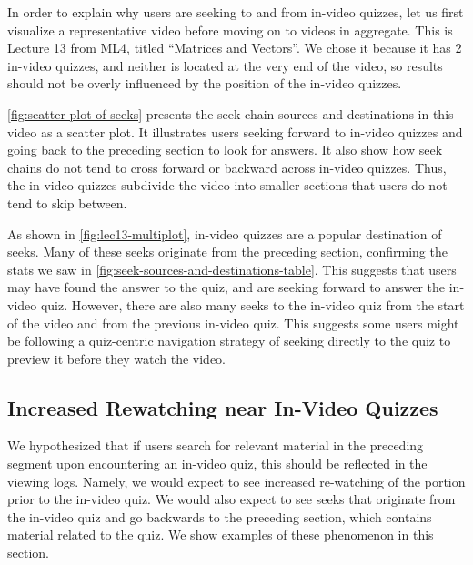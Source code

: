 \documentclass{sigchi}
\begin{document}
In order to explain why users are seeking to and from in-video quizzes, let us first visualize a representative video before moving on to videos in aggregate. This is Lecture 13 from ML4, titled ``Matrices and Vectors''. We chose it because it has 2 in-video quizzes, and neither is located at the very end of the video, so results should not be overly influenced by the position of the in-video quizzes.

\autoref{fig:scatter-plot-of-seeks} presents the seek chain sources and destinations in this video as a scatter plot. It illustrates users seeking forward to in-video quizzes and going back to the preceding section to look for answers. It also show how seek chains do not tend to cross forward or backward across in-video quizzes. Thus, the in-video quizzes subdivide the video into smaller sections that users do not tend to skip between.

As shown in \autoref{fig:lec13-multiplot}, in-video quizzes are a popular destination of seeks. Many of these seeks originate from the preceding section, confirming the stats we saw in \autoref{fig:seek-sources-and-destinations-table}. This suggests that users may have found the answer to the quiz, and are seeking forward to answer the in-video quiz. However, there are also many seeks to the in-video quiz from the start of the video and from the previous in-video quiz. This suggests some users might be following a quiz-centric navigation strategy of seeking directly to the quiz to preview it before they watch the video.


\subsection{Increased Rewatching near In-Video Quizzes}

We hypothesized that if users search for relevant material in the preceding segment upon encountering an in-video quiz, this should be reflected in the viewing logs. Namely, we would expect to see increased re-watching of the portion prior to the in-video quiz. We would also expect to see seeks that originate from the in-video quiz and go backwards to the preceding section, which contains material related to the quiz. We show examples of these phenomenon in this section.
\end{document}
